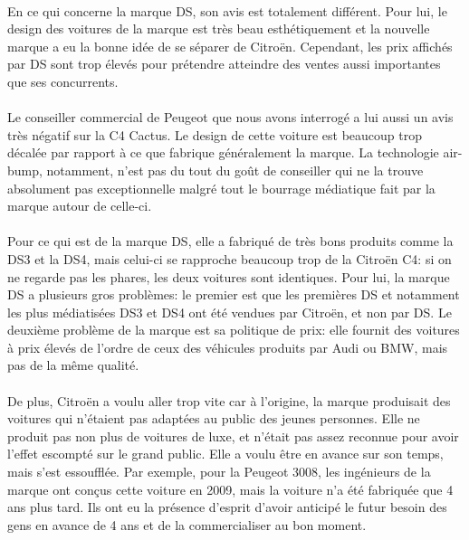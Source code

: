 \documentclass[12pt]{article}\usepackage[]{graphicx}\usepackage[]{color}
\begin{document}
\paragraph{} En ce qui concerne la marque DS, son avis est totalement
différent. Pour lui, le design des voitures de la marque est très beau
esthétiquement et la nouvelle marque a eu la bonne idée de se séparer de
Citroën. Cependant, les prix affichés par DS sont trop élevés pour prétendre
atteindre des ventes aussi importantes que ses concurrents.

\paragraph{} Le conseiller commercial de Peugeot que nous avons interrogé a lui
aussi un avis très négatif sur la C4 Cactus. Le design de cette voiture est
beaucoup trop décalée par rapport à ce que fabrique généralement la marque. La
technologie air-bump, notamment, n'est pas du tout du goût de conseiller qui ne
la trouve absolument pas exceptionnelle malgré tout le bourrage médiatique fait
par la marque autour de celle-ci.

\paragraph{} Pour ce qui est de la marque DS, elle a fabriqué de très bons
produits comme la DS3 et la DS4, mais celui-ci se rapproche beaucoup trop de la
Citroën C4: si on ne regarde pas les phares, les deux voitures sont identiques.
Pour lui, la marque DS a plusieurs gros problèmes: le premier est que les
premières DS et notamment les plus médiatisées DS3 et DS4 ont été vendues par
Citroën, et non par DS. Le deuxième problème de la marque est sa politique de
prix: elle fournit des voitures à prix élevés de l'ordre de ceux des véhicules
produits par Audi ou BMW, mais pas de la même qualité.

\paragraph{} De plus, Citroën a voulu aller trop vite car à l'origine, la
marque produisait des voitures qui n'étaient pas adaptées au public des jeunes
personnes.  Elle ne produit pas non plus de voitures de luxe, et n'était pas
assez reconnue pour avoir l'effet escompté sur le grand public. Elle a voulu
être en avance sur son temps, mais s'est essoufflée. Par exemple, pour la
Peugeot 3008, les ingénieurs de la marque ont conçus cette voiture en 2009,
mais la voiture n'a été fabriquée que 4 ans plus tard. Ils ont eu la présence
d'esprit d'avoir anticipé le futur besoin des gens en avance de 4 ans et de la
commercialiser au bon moment.
\end{document}
